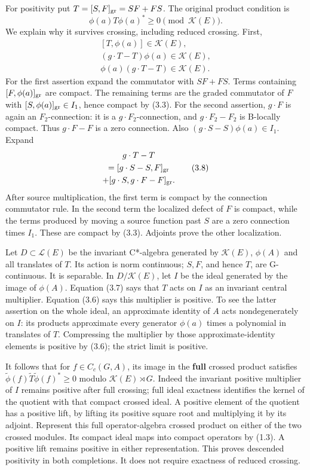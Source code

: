 \documentclass[
  11pt,
]{article}
\begin{document}
For positivity put \(T=[S,F]_{\rm gr}=SF+FS\). The original product
condition is \[
\phi(a)T\phi(a)^*\geq0
       \pmod{\mathcal K(E)}.
\tag{3.6}
\] We explain why it survives crossing, including reduced crossing.
First, \[
\begin{gathered}
{}[T,\phi(a)]\in\mathcal K(E),\\
(g\cdot T-T)\phi(a)\in\mathcal K(E),\\
\phi(a)(g\cdot T-T)\in\mathcal K(E).
\end{gathered}
\tag{3.7}
\] For the first assertion expand the commutator with \(SF+FS\). Terms
containing \([F,\phi(a)]_{\rm gr}\) are compact. The remaining terms are
the graded commutator of \(F\) with \([S,\phi(a)]_{\rm gr}\in I_1\),
hence compact by (3.3). For the second assertion, \(g\cdot F\) is again
an \(F_2\)-connection: it is a \(g\cdot F_2\)-connection, and
\(g\cdot F_2-F_2\) is B-locally compact. Thus \(g\cdot F-F\) is a zero
connection. Also \((g\cdot S-S)\phi(a)\in I_1\). Expand \[
\begin{gathered}
g\cdot T-T\\
=[g\cdot S-S,F]_{\rm gr}\\
  +[g\cdot S,g\cdot F-F]_{\rm gr}.
\end{gathered}
\tag{3.8}
\] After source multiplication, the first term is compact by the
connection commutator rule. In the second term the localized defect of
\(F\) is compact, while the terms produced by moving a source function
past \(S\) are a zero connection times \(I_1\). These are compact by
(3.3). Adjoints prove the other localization.

Let \(D\subset\mathcal L(E)\) be the invariant C*-algebra generated by
\(\mathcal K(E)\), \(\phi(A)\) and all translates of \(T\). Its action
is norm continuous; \(S,F\), and hence \(T\), are G-continuous. It is
separable. In \(D/\mathcal K(E)\), let \(I\) be the ideal generated by
the image of \(\phi(A)\). Equation (3.7) says that \(T\) acts on \(I\)
as an invariant central multiplier. Equation (3.6) says this multiplier
is positive. To see the latter assertion on the whole ideal, an
approximate identity of \(A\) acts nondegenerately on \(I\): its
products approximate every generator \(\phi(a)\) times a polynomial in
translates of \(T\). Compressing the multiplier by those
approximate-identity elements is positive by (3.6); the strict limit is
positive.

It follows that for \(f\in C_c(G,A)\), its image in the \textbf{full}
crossed product satisfies
\(\widetilde\phi(f)\widetilde T\widetilde\phi(f)^*\geq0\) modulo
\(\mathcal K(E)\rtimes G\). Indeed the invariant positive multiplier of
\(I\) remains positive after full crossing; full ideal exactness
identifies the kernel of the quotient with that compact crossed ideal. A
positive element of the quotient has a positive lift, by lifting its
positive square root and multiplying it by its adjoint. Represent this
full operator-algebra crossed product on either of the two crossed
modules. Its compact ideal maps into compact operators by (1.3). A
positive lift remains positive in either representation. This proves
descended positivity in both completions. It does not require exactness
of reduced crossing.
\end{document}
